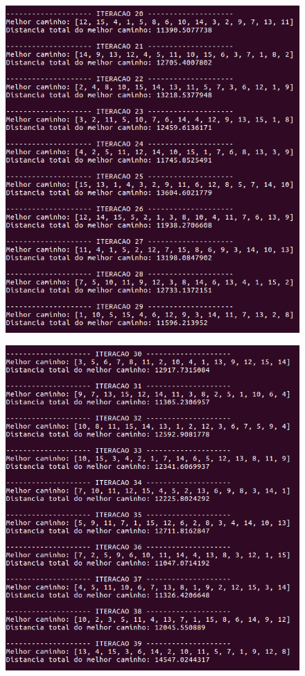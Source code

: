 \documentclass[hidelinks,12pt]{article}
\begin{document}
		\newpage
		
		\begin{figure}[!h]
			\centering
			\includegraphics[scale=0.6]{Figures/m15-1-3.png}
		\end{figure}

		\newpage
		
		\begin{figure}[!h]
			\centering
			\includegraphics[scale=0.6]{Figures/m15-1-4.png}
		\end{figure}
\end{document}
